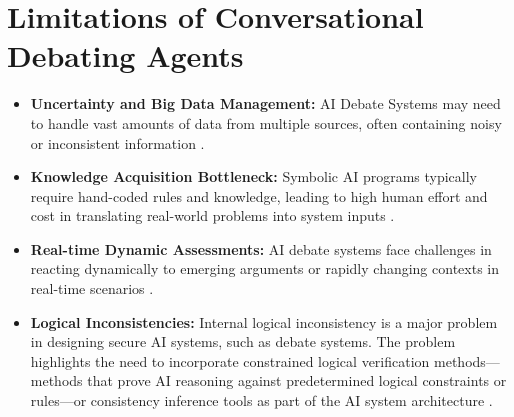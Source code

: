 \documentclass[conference]{IEEEtran}
\begin{document}
\section{Limitations of Conversational Debating Agents}
\begin{itemize}
    \item \textbf{Uncertainty and Big Data Management:} AI Debate Systems may need to handle vast amounts of data from multiple sources, often containing noisy or inconsistent information \cite{kasif2024trilogy}.
    
    \item \textbf{Knowledge Acquisition Bottleneck:} Symbolic AI programs typically require hand-coded rules and knowledge, leading to high human effort and cost in translating real-world problems into system inputs \cite{kasif2024trilogy}.
    
    \item \textbf{Real-time Dynamic Assessments:} AI debate systems face challenges in reacting dynamically to emerging arguments or rapidly changing contexts in real-time scenarios \cite{kasif2024trilogy}.
    
    \item \textbf{Logical Inconsistencies:} Internal logical inconsistency is a major problem in designing secure AI systems, such as debate systems. The problem highlights the need to incorporate constrained logical verification methods—methods that prove AI reasoning against predetermined logical constraints or rules—or consistency inference tools as part of the AI system architecture \cite{ilkou2020symbolic}.
\end{itemize}
\end{document}
